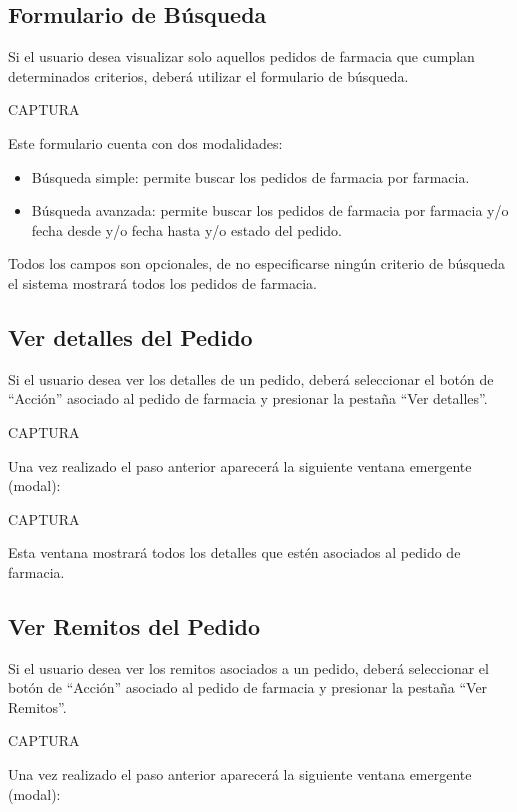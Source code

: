 \documentclass[letterpaper,10pt,spanish]{sphinxmanual}
\begin{document}
\subsection{Formulario de Búsqueda}
\label{pedidosfarmacia:formulario-de-busqueda}
Si el usuario desea visualizar solo aquellos pedidos de farmacia que cumplan determinados criterios, deberá utilizar el formulario de búsqueda.

CAPTURA

Este formulario cuenta con dos modalidades:
\begin{itemize}
\item {} 
Búsqueda simple: permite buscar los pedidos de farmacia por farmacia.

\item {} 
Búsqueda avanzada: permite buscar los pedidos de farmacia por farmacia y/o  fecha desde y/o fecha hasta y/o estado del pedido.

\end{itemize}

Todos los campos son opcionales, de no especificarse ningún criterio de búsqueda el sistema mostrará todos los pedidos de farmacia.


\subsection{Ver detalles del Pedido}
\label{pedidosfarmacia:ver-detalles-del-pedido}
Si el usuario desea ver los detalles de un pedido, deberá seleccionar el botón de “Acción” asociado al pedido de farmacia y presionar la pestaña “Ver detalles”.

CAPTURA

Una vez realizado el paso anterior aparecerá la siguiente ventana emergente (modal):

CAPTURA

Esta ventana mostrará todos los detalles que estén asociados al pedido de farmacia.


\subsection{Ver Remitos del Pedido}
\label{pedidosfarmacia:ver-remitos-del-pedido}
Si el usuario desea ver los remitos asociados a un pedido, deberá seleccionar el botón de “Acción” asociado al pedido de farmacia y presionar la pestaña “Ver Remitos”.

CAPTURA

Una vez realizado el paso anterior aparecerá la siguiente ventana emergente (modal):
\end{document}
